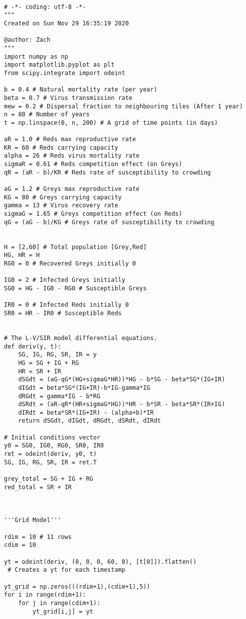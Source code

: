 \documentclass{article}
\begin{document}
\begin{verbatim}

# -*- coding: utf-8 -*-
"""
Created on Sun Nov 29 16:35:19 2020

@author: Zach
"""
import numpy as np
import matplotlib.pyplot as plt
from scipy.integrate import odeint 

b = 0.4 # Natural mortality rate (per year)
beta = 0.7 # Virus transmission rate
mew = 0.2 # Dispersal fraction to neighbouring tiles (After 1 year)
n = 80 # Number of years
t = np.linspace(0, n, 200) # A grid of time points (in days)

aR = 1.0 # Reds max reproductive rate
KR = 60 # Reds carrying capacity
alpha = 26 # Reds virus mortality rate
sigmaR = 0.61 # Reds competition effect (on Greys)
qR = (aR - b)/KR # Reds rate of susceptibility to crowding

aG = 1.2 # Greys max reproductive rate
KG = 80 # Greys carrying capacity
gamma = 13 # Virus recovery rate
sigmaG = 1.65 # Greys competition effect (on Reds)
qG = (aG - b)/KG # Greys rate of susceptibility to crowding


H = [2,60] # Total population [Grey,Red]
HG, HR = H
RG0 = 0 # Recovered Greys initially 0

IG0 = 2 # Infected Greys initially
SG0 = HG - IG0 - RG0 # Susceptible Greys 

IR0 = 0 # Infected Reds initially 0
SR0 = HR - IR0 # Susceptible Reds 


# The L-V/SIR model differential equations.
def deriv(y, t):
    SG, IG, RG, SR, IR = y
    HG = SG + IG + RG
    HR = SR + IR
    dSGdt = (aG-qG*(HG+sigmaG*HR))*HG - b*SG - beta*SG*(IG+IR)
    dIGdt = beta*SG*(IG+IR)-b*IG-gamma*IG
    dRGdt = gamma*IG - b*RG
    dSRdt = (aR-qR*(HR+sigmaG*HG))*HR - b*SR - beta*SR*(IR+IG)
    dIRdt = beta*SR*(IG+IR) - (alpha+b)*IR 
    return dSGdt, dIGdt, dRGdt, dSRdt, dIRdt

# Initial conditions vector
y0 = SG0, IG0, RG0, SR0, IR0
ret = odeint(deriv, y0, t)
SG, IG, RG, SR, IR = ret.T

grey_total = SG + IG + RG
red_total = SR + IR



'''Grid Model'''

rdim = 10 # 11 rows
cdim = 10

yt = odeint(deriv, (0, 0, 0, 60, 0), [t[0]]).flatten()
 # Creates a yt for each timestamp

yt_grid = np.zeros(((rdim+1),(cdim+1),5))
for i in range(rdim+1):
    for j in range(cdim+1):
        yt_grid[i,j] = yt


\end{verbatim}
\end{document}
